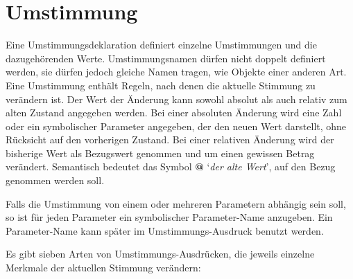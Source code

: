 


\chapter{Umstimmung}\label{cha:umstimmung}
Eine Umstimmungsdeklaration definiert einzelne Umstimmungen und die
dazugehörenden Werte. Umstimmungsnamen dürfen nicht doppelt definiert
werden, sie dürfen jedoch gleiche Namen tragen,
wie Objekte einer anderen Art.
Eine Umstimmung enthält Regeln, nach denen die aktuelle Stimmung
 zu
verändern ist. Der Wert der Änderung kann sowohl absolut als auch
relativ zum alten Zustand angegeben werden. Bei einer absoluten Änderung
wird eine Zahl oder ein symbolischer Parameter angegeben, der den
neuen Wert darstellt, ohne Rücksicht auf den vorherigen Zustand.
Bei einer relativen Änderung wird der bisherige Wert als Bezugswert
genommen und um einen gewissen Betrag verändert. Semantisch bedeutet das
Symbol \textbf{@} `\emph{der alte Wert}',
auf den Bezug genommen werden soll.

Falls die Umstimmung von einem oder mehreren Parametern
 abhängig sein soll,
so ist für jeden Parameter
 ein symbolischer Parameter-Name anzugeben.
Ein Parameter-Name kann später im Umstimmungs-Ausdruck benutzt werden.




Es gibt sieben Arten von Umstimmungs-Ausdrücken, die jeweils einzelne
Merkmale der aktuellen Stimmung ver\-än\-dern:




